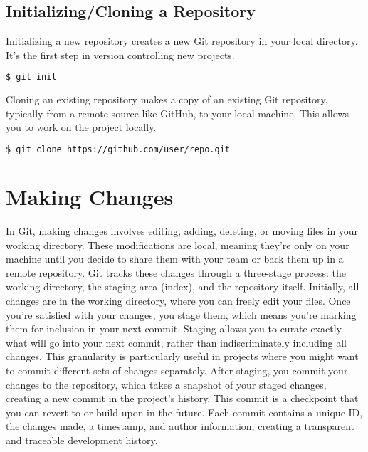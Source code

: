 \documentclass[10pt,twocolumn]{article}
\begin{document}
\subsection{Initializing/Cloning a Repository}

Initializing a new repository creates a new Git repository in your local directory. It's the first step in version controlling new projects.
\begin{lstlisting}[language=bash]
  $ git init
\end{lstlisting}
Cloning an existing repository makes a copy of an existing Git repository, typically from a remote source like GitHub, to your local machine. This allows you to work on the project locally.
\begin{lstlisting}[language=bash]
  $ git clone https://github.com/user/repo.git
\end{lstlisting}

\section{Making Changes}

In Git, making changes involves editing, adding, deleting, or moving files in your working directory. These modifications are local, meaning they're only on your machine until you decide to share them with your team or back them up in a remote repository. Git tracks these changes through a three-stage process: the working directory, the staging area (index), and the repository itself. Initially, all changes are in the working directory, where you can freely edit your files. Once you're satisfied with your changes, you stage them, which means you're marking them for inclusion in your next commit. Staging allows you to curate exactly what will go into your next commit, rather than indiscriminately including all changes. This granularity is particularly useful in projects where you might want to commit different sets of changes separately. After staging, you commit your changes to the repository, which takes a snapshot of your staged changes, creating a new commit in the project's history. This commit is a checkpoint that you can revert to or build upon in the future. Each commit contains a unique ID, the changes made, a timestamp, and author information, creating a transparent and traceable development history.
\end{document}
